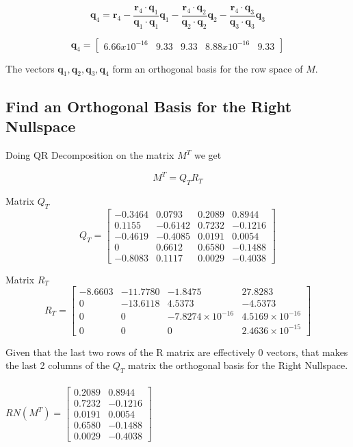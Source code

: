 \documentclass{article}
\begin{document}
\[
\mathbf{q}_4 = \mathbf{r}_4 - \frac{\mathbf{r}_4 \cdot \mathbf{q}_1}{\mathbf{q}_1 \cdot \mathbf{q}_1} \mathbf{q}_1 - \frac{\mathbf{r}_4 \cdot \mathbf{q}_2}{\mathbf{q}_2 \cdot \mathbf{q}_2} \mathbf{q}_2 - \frac{\mathbf{r}_4 \cdot \mathbf{q}_3}{\mathbf{q}_3 \cdot \mathbf{q}_3} \mathbf{q}_3
\]

\[
\mathbf{q}_4 = \begin{bmatrix} 6.66x10^{-16} & 9.33 & 9.33 & 8.88x10^{-16} & 9.33 \end{bmatrix}
\]

The vectors \( \mathbf{q}_1, \mathbf{q}_2, \mathbf{q}_3, \mathbf{q}_4 \) form an orthogonal basis for the row space of \( M \).

\subsection{Find an Orthogonal Basis for the Right Nullspace}

Doing QR Decomposition on the matrix $M^T$ we get 

\[
M^T = Q_T R_T
\]

Matrix \( Q_T \)
\[
Q_T = \begin{bmatrix}
    -0.3464 & 0.0793 & 0.2089 & 0.8944 \\
    0.1155 & -0.6142 & 0.7232 & -0.1216 \\
    -0.4619 & -0.4085 & 0.0191 & 0.0054 \\
    0 & 0.6612 & 0.6580 & -0.1488 \\
    -0.8083 & 0.1117 & 0.0029 & -0.4038
\end{bmatrix}
\]

Matrix \( R_T \)
\[
R_T = \begin{bmatrix}
    -8.6603 & -11.7780 & -1.8475 & 27.8283 \\
    0 & -13.6118 & 4.5373 & -4.5373 \\
    0 & 0 & -7.8274 \times 10^{-16} & 4.5169 \times 10^{-16} \\
    0 & 0 & 0 & 2.4636 \times 10^{-15}
\end{bmatrix}
\]

Given that the last two rows of the R matrix are effectively 0 vectors, that makes the last 2 columns of the $Q_T$ matrix the orthogonal basis for the Right Nullspace.
\\
\\
$RN(M^T) = \begin{bmatrix}
    0.2089 & 0.8944 \\
    0.7232 & -0.1216 \\
    0.0191 & 0.0054 \\
    0.6580 & -0.1488 \\
    0.0029 & -0.4038
\end{bmatrix}$
\end{document}
